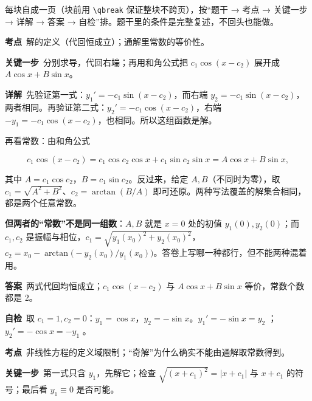 \documentclass[11pt]{ctexart}
\renewcommand{\qbreak}{\needspace{0.26\textheight}}
\newcommand{\qpagebreak}{\needspace{0.92\textheight}}
\begin{document}
每块自成一页（块前用 \verb|\qbreak| 保证整块不跨页），按“题干 → 考点 → 关键一步 → 详解 → 答案 → 自检”排。题干里的条件是完整复述，不回头也能做。

\qpagebreak
{}
\label{c1:app:a1}

\qbreak
{}

\textbf{考点}\ 解的定义（代回恒成立）；通解里常数的等价性。

\textbf{关键一步}\ 分别求导，代回右端；再用和角公式把 $c_1\cos(x-c_2)$ 展开成 $A\cos x+B\sin x$。

\textbf{详解}\ 先验证第一式：$y_1'=-c_1\sin(x-c_2)$，而右端 $y_2=-c_1\sin(x-c_2)$，两者相同。再验证第二式：$y_2'=-c_1\cos(x-c_2)$，右端 $-y_1=-c_1\cos(x-c_2)$，也相同。所以这组函数是解。

再看常数：由和角公式

\[
c_1\cos(x-c_2)=c_1\cos c_2\cos x+c_1\sin c_2\sin x=A\cos x+B\sin x,
\]

其中 $A=c_1\cos c_2$，$B=c_1\sin c_2$。反过来，给定 $A,B$（不同时为零），取 $c_1=\sqrt{A^2+B^2}$、$c_2=\arctan(B/A)$ 即可还原。两种写法覆盖的解集合相同，都是两个任意常数。

\textbf{但两者的“常数”不是同一组数}：$A,B$ 就是 $x=0$ 处的初值 $y_1(0),y_2(0)$；而 $c_1,c_2$ 是振幅与相位，$c_1=\sqrt{y_1(x_0)^2+y_2(x_0)^2}$，$c_2=x_0-\arctan\bigl(-y_2(x_0)/y_1(x_0)\bigr)$。答卷上写哪一种都行，但不能两种混着用。

\textbf{答案}\ 两式代回均恒成立；$c_1\cos(x-c_2)$ 与 $A\cos x+B\sin x$ 等价，常数个数都是 2。

\textbf{自检}\ 取 $c_1=1,c_2=0$：$y_1=\cos x$，$y_2=-\sin x$。$y_1'=-\sin x=y_2$ ；$y_2'=-\cos x=-y_1$ 。

\qpagebreak
{}
\label{c1:app:a2}

\qbreak
{}

\textbf{考点}\ 非线性方程的定义域限制；“奇解”为什么确实不能由通解取常数得到。

\textbf{关键一步}\ 第一式只含 $y_1$，先解它；检查 $\sqrt{(x+c_1)^2}=|x+c_1|$ 与 $x+c_1$ 的符号；最后看 $y_1\equiv0$ 是否可能。
\end{document}
